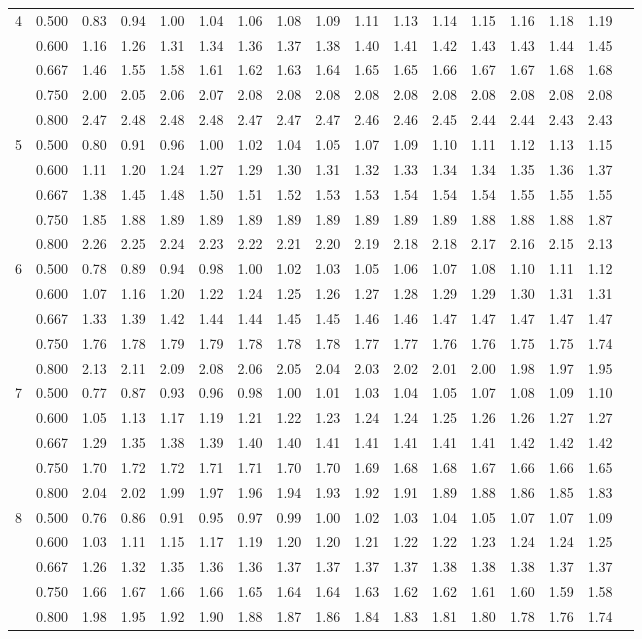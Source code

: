 \documentclass[pdftex,11pt,openany]{book}\usepackage[]{graphicx}\usepackage[]{color}
\begin{document}
{\begin{center}
\begin{tabular}{rrr@{\,}r@{\,}r@{\,}r@{\,}r@{\,}r@{\,}r@{\,}r
                   @{\,}r@{\,}r@{\,}r@{\,}r@{\,}r@{\,}r@{\,}r}
4&0.500&0.83&0.94&1.00&1.04&1.06&1.08&1.09&1.11&1.13&1.14&1.15&1.16&1.18&1.19\\
 &0.600&1.16&1.26&1.31&1.34&1.36&1.37&1.38&1.40&1.41&1.42&1.43&1.43&1.44&1.45\\
 &0.667&1.46&1.55&1.58&1.61&1.62&1.63&1.64&1.65&1.65&1.66&1.67&1.67&1.68&1.68\\
 &0.750&2.00&2.05&2.06&2.07&2.08&2.08&2.08&2.08&2.08&2.08&2.08&2.08&2.08&2.08\\
 &0.800&2.47&2.48&2.48&2.48&2.47&2.47&2.47&2.46&2.46&2.45&2.44&2.44&2.43&2.43\\
5&0.500&0.80&0.91&0.96&1.00&1.02&1.04&1.05&1.07&1.09&1.10&1.11&1.12&1.13&1.15\\
 &0.600&1.11&1.20&1.24&1.27&1.29&1.30&1.31&1.32&1.33&1.34&1.34&1.35&1.36&1.37\\
 &0.667&1.38&1.45&1.48&1.50&1.51&1.52&1.53&1.53&1.54&1.54&1.54&1.55&1.55&1.55\\
 &0.750&1.85&1.88&1.89&1.89&1.89&1.89&1.89&1.89&1.89&1.89&1.88&1.88&1.88&1.87\\
 &0.800&2.26&2.25&2.24&2.23&2.22&2.21&2.20&2.19&2.18&2.18&2.17&2.16&2.15&2.13\\
6&0.500&0.78&0.89&0.94&0.98&1.00&1.02&1.03&1.05&1.06&1.07&1.08&1.10&1.11&1.12\\
 &0.600&1.07&1.16&1.20&1.22&1.24&1.25&1.26&1.27&1.28&1.29&1.29&1.30&1.31&1.31\\
 &0.667&1.33&1.39&1.42&1.44&1.44&1.45&1.45&1.46&1.46&1.47&1.47&1.47&1.47&1.47\\
 &0.750&1.76&1.78&1.79&1.79&1.78&1.78&1.78&1.77&1.77&1.76&1.76&1.75&1.75&1.74\\
 &0.800&2.13&2.11&2.09&2.08&2.06&2.05&2.04&2.03&2.02&2.01&2.00&1.98&1.97&1.95\\
7&0.500&0.77&0.87&0.93&0.96&0.98&1.00&1.01&1.03&1.04&1.05&1.07&1.08&1.09&1.10\\
 &0.600&1.05&1.13&1.17&1.19&1.21&1.22&1.23&1.24&1.24&1.25&1.26&1.26&1.27&1.27\\
 &0.667&1.29&1.35&1.38&1.39&1.40&1.40&1.41&1.41&1.41&1.41&1.41&1.42&1.42&1.42\\
 &0.750&1.70&1.72&1.72&1.71&1.71&1.70&1.70&1.69&1.68&1.68&1.67&1.66&1.66&1.65\\
 &0.800&2.04&2.02&1.99&1.97&1.96&1.94&1.93&1.92&1.91&1.89&1.88&1.86&1.85&1.83\\
8&0.500&0.76&0.86&0.91&0.95&0.97&0.99&1.00&1.02&1.03&1.04&1.05&1.07&1.07&1.09\\
 &0.600&1.03&1.11&1.15&1.17&1.19&1.20&1.20&1.21&1.22&1.22&1.23&1.24&1.24&1.25\\
 &0.667&1.26&1.32&1.35&1.36&1.36&1.37&1.37&1.37&1.37&1.38&1.38&1.38&1.37&1.37\\
 &0.750&1.66&1.67&1.66&1.66&1.65&1.64&1.64&1.63&1.62&1.62&1.61&1.60&1.59&1.58\\
 &0.800&1.98&1.95&1.92&1.90&1.88&1.87&1.86&1.84&1.83&1.81&1.80&1.78&1.76&1.74
\end{tabular}
\end{center}


}
\end{document}
